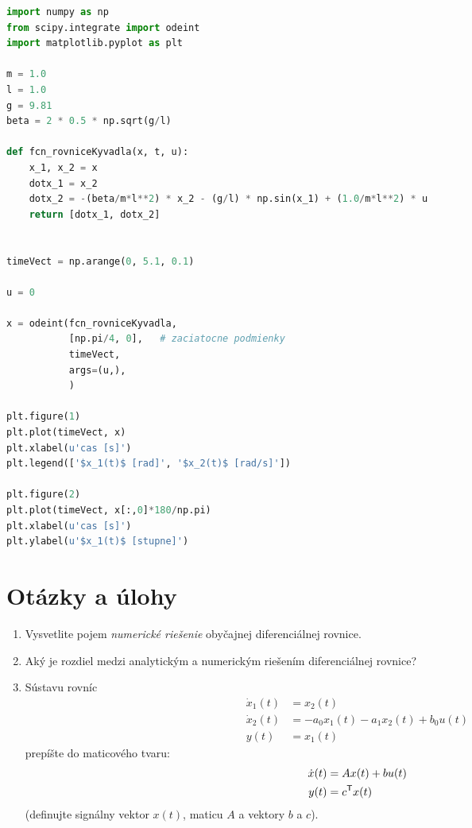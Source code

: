 \documentclass[a4paper, 10pt, ]{article}
\begin{document}
\begin{lstlisting}[language=Python, title=Skript v Python-e]
import numpy as np
from scipy.integrate import odeint
import matplotlib.pyplot as plt

m = 1.0
l = 1.0
g = 9.81
beta = 2 * 0.5 * np.sqrt(g/l)

def fcn_rovniceKyvadla(x, t, u):
    x_1, x_2 = x
    dotx_1 = x_2
    dotx_2 = -(beta/m*l**2) * x_2 - (g/l) * np.sin(x_1) + (1.0/m*l**2) * u
    return [dotx_1, dotx_2]


timeVect = np.arange(0, 5.1, 0.1)

u = 0

x = odeint(fcn_rovniceKyvadla,
           [np.pi/4, 0],   # zaciatocne podmienky
           timeVect,
           args=(u,),
           )

plt.figure(1)
plt.plot(timeVect, x)
plt.xlabel(u'cas [s]')
plt.legend(['$x_1(t)$ [rad]', '$x_2(t)$ [rad/s]'])

plt.figure(2)
plt.plot(timeVect, x[:,0]*180/np.pi)
plt.xlabel(u'cas [s]')
plt.ylabel(u'$x_1(t)$ [stupne]')
\end{lstlisting}



















\section{Otázky a úlohy}

\begin{enumerate}[leftmargin=0pt, labelsep=3mm, itemsep=0pt]
    
    \item Vysvetlite pojem \emph{numerické riešenie} obyčajnej diferenciálnej rovnice.

    \item Aký je rozdiel medzi analytickým a numerickým riešením diferenciálnej rovnice?


    \item Sústavu rovníc
    \begin{align*}
        \dot x_1(t) &= x_2(t) \\
        \dot x_2(t) &= - a_0 x_1(t) - a_1 x_2(t) + b_0 u(t) \\
        y(t) &= x_1(t)
    \end{align*}
    prepíšte do maticového tvaru:
    \begin{align*}
        \dot x(t) &= Ax(t) + bu(t) \\
        y(t) &= c^{\mathsf{T}} x(t)
    \end{align*}
    (definujte signálny vektor $x(t)$, maticu $A$ a vektory $b$ a $c$).


\end{enumerate}














\end{document}
